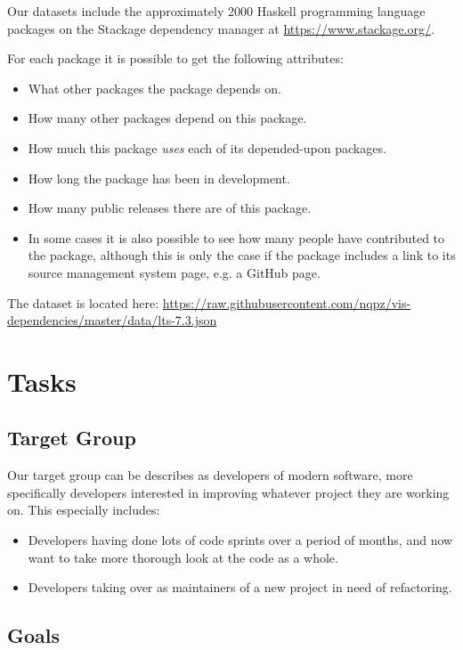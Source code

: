 \documentclass[a4paper,12pt]{article}
\begin{document}
Our datasets include the approximately 2000 Haskell programming language
packages on the Stackage dependency manager at \url{https://www.stackage.org/}.

For each package it is possible to get the following attributes:

\begin{itemize}
\item What other packages the package depends on.
\item How many other packages depend on this package.
\item How much this package \emph{uses} each of its depended-upon
packages.
\item How long the package has been in development.
\item How many public releases there are of this package.
\item In some cases it is also possible to see how many people have contributed
to the package, although this is only the case if the package includes a link to
its source management system page, e.g. a GitHub page.
\end{itemize}

The dataset is located here:
\url{https://raw.githubusercontent.com/nqpz/vis-dependencies/master/data/lts-7.3.json}

\section{Tasks}

\subsection{Target Group}

Our target group can be describes as developers of modern software, more
specifically developers interested in improving whatever project they are
working on.  This especially includes:

\begin{itemize}
\item Developers having done lots of code sprints over a period of months, and
now want to take more thorough look at the code as a whole.
\item Developers taking over as maintainers of a new project in need of
refactoring.
\end{itemize}

\subsection{Goals}
\end{document}
